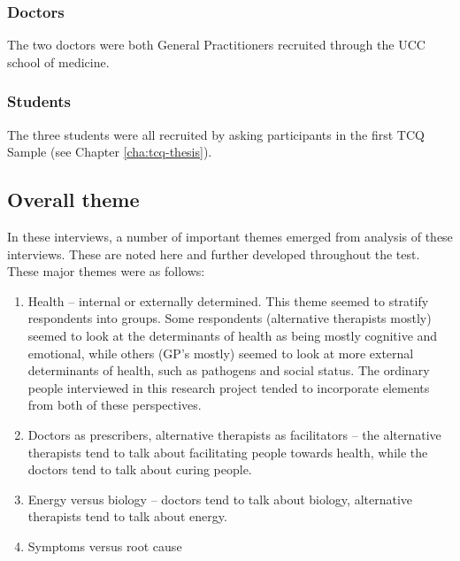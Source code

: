 \subsubsection{Doctors}
\label{sec:doctors}

The two doctors were both General Practitioners recruited through the UCC school of medicine. 

\subsubsection{Students}
\label{sec:students}

The three students were all recruited by asking participants in the first TCQ Sample (see Chapter \ref{cha:tcq-thesis}). 



\subsection{Overall theme}

In these interviews, a number of important themes emerged from analysis of these interviews. These are noted here and further developed throughout the test. These major themes were as follows:
\begin{enumerate}
\item Health – internal or externally determined. This theme seemed to stratify respondents into groups. Some respondents (alternative therapists mostly) seemed to look at the determinants of health as being mostly cognitive and emotional, while others (GP's mostly) seemed to look at more external determinants of health, such as pathogens and social status. The ordinary people interviewed in this research project tended to incorporate elements from both of these perspectives.
\item Doctors as prescribers, alternative therapists as facilitators – the alternative therapists tend to talk about facilitating people towards health, while the doctors tend to talk about curing people. 
\item Energy versus biology – doctors tend to talk about biology, alternative therapists tend to talk about energy. 
\item Symptoms versus root cause

\end{enumerate}





